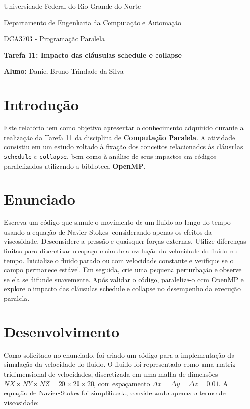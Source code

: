 \documentclass[a4paper, 12pt]{article}
\begin{document}
	\begin{center}
		Universidade Federal do Rio Grande do Norte
		
		Departamento de Engenharia da Computação e Automação  
		
		DCA3703 - Programação Paralela  
		
		\textbf{Tarefa 11: Impacto das cláusulas schedule e collapse}  
		
		\textbf{Aluno:} Daniel Bruno Trindade da Silva  
	\end{center}  
	
	\section{Introdução}  
	\hspace{.62cm}Este relatório tem como objetivo apresentar o conhecimento adquirido durante a realização da Tarefa 11 da disciplina de \textbf{Computação Paralela}. A atividade consistiu em um estudo voltado à fixação dos conceitos relacionados às cláusulas \texttt{schedule} e \texttt{collapse}, bem como à análise de seus impactos em códigos paralelizados utilizando a biblioteca \textbf{OpenMP}.  
	
	\section{Enunciado}   
	
	\hspace{.62cm}Escreva um código que simule o movimento de um fluido ao longo do tempo usando a equação de Navier-Stokes, considerando apenas os efeitos da viscosidade. Desconsidere a pressão e quaisquer forças externas. Utilize diferenças finitas para discretizar o espaço e simule a evolução da velocidade do fluido no tempo. Inicialize o fluido parado ou com velocidade constante e verifique se o campo permanece estável. Em seguida, crie uma pequena perturbação e observe se ela se difunde suavemente. Após validar o código, paralelize-o com OpenMP e explore o impacto das cláusulas schedule e collapse no desempenho da execução paralela.  
	
	\section{Desenvolvimento}  
	\hspace{.62cm}Como solicitado no enunciado, foi criado um código para a implementação da simulação da velocidade do fluido. O fluido foi representado como uma matriz tridimensional de velocidades, discretizada em uma malha de dimensões \( NX \times NY \times NZ = 20 \times 20 \times 20 \), com espaçamento \( \Delta x = \Delta y = \Delta z = 0.01 \). A equação de Navier-Stokes foi simplificada, considerando apenas o termo de viscosidade:  
	
\end{document}
